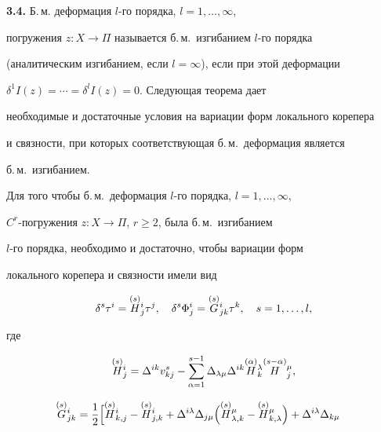 {\bf 3.4.} Б.\,м. деформация $l$-го порядка, $l=1,\dotsc,\infty$,


погружения $z:X\to\Pi$ называется б.\,м.~изгибанием $l$-го порядка


(аналитическим изгибанием, если $l=\infty$), если при этой деформации


$\delta^1I(z)=\dotsb=\delta^lI(z)=0$. Следующая теорема дает


необходимые и достаточные условия на вариации форм локального корепера


и связности, при которых соответствующая б.\,м.~деформация является


б.\,м.~изгибанием.


\begin{thm}


Для того чтобы б.\,м.~деформация $l$-го порядка, $l=1,\dotsc,\infty$,


$C^r$-погружения $z:X\to\Pi$, $r\ge 2$, была б.\,м.~изгибанием


$l$-го порядка, необходимо и достаточно, чтобы вариации форм


локального корепера и связности имели вид


\begin{equation}


\delta^s\tau^i=\sv{(s)}H^i_j\tau^j,\quad \delta^s\Phi^i_j=


\sv{(s)}G^i_{jk}\tau^k,\quad s=1,\dotsc,l,


\end{equation}


где


\begin{equation}


\sv{(s)}H^i_j=\Delta^{ik}v^s_{kj}-\sum_{\alpha=1}^{s-1}


\Delta_{\lambda\mu}\Delta^{ik}\sv{(\alpha)}H^{\lambda}_k


\sv{(s-\alpha)}H^{\mu}_j,


\end{equation}


\begin{equation}


\begin{split}


\sv{(s)}G^i_{jk}&=\frac{1}{2}\Bigl[\sv{(s)}H^i_{k,j}-\sv{(s)}H^i_{j,k}+


\Delta^{i\lambda}\Delta_{j\mu}\Bigl(\sv{(s)}H^{\mu}_{\lambda,k}-


\sv{(s)}H^{\mu}_{k,\lambda}\Bigr)+


\Delta^{i\lambda}\Delta_{k\mu}



\end{split}
\end{equation}
\end{thm}
